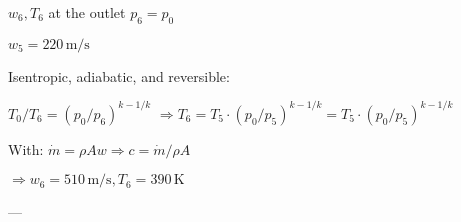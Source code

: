 \( w_6, T_6 \) at the outlet  
\( p_6 = p_0 \)  

\( w_5 = 220 \, \text{m/s} \)  

Isentropic, adiabatic, and reversible:  

\( T_0 / T_6 = (p_0 / p_6)^{k-1/k} \)  
\( \Rightarrow T_6 = T_5 \cdot (p_0 / p_5)^{k-1/k} = T_5 \cdot (p_0 / p_5)^{k-1/k} \)  

With:  
\( \dot{m} = \rho A w \Rightarrow c = \dot{m} / \rho A \)  

\( \Rightarrow w_6 = 510 \, \text{m/s}, T_6 = 390 \, \text{K} \)  

---